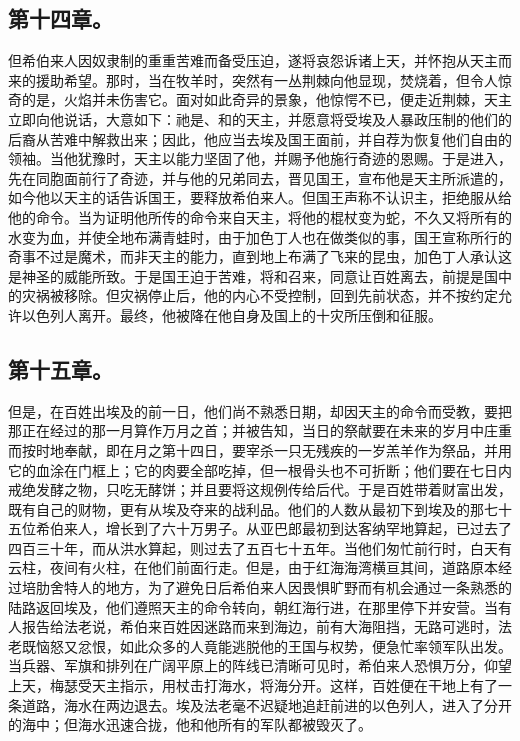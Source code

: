 
\subsection{第十四章。}

但希伯来人因奴隶制的重重苦难而备受压迫，遂将哀怨诉诸上天，并怀抱从天主而来的援助希望。那时，当在牧羊时，突然有一丛荆棘向他显现，焚烧着，但令人惊奇的是，火焰并未伤害它。面对如此奇异的景象，他惊愕不已，便走近荆棘，天主立即向他说话，大意如下：祂是、和的天主，并愿意将受埃及人暴政压制的他们的后裔从苦难中解救出来；因此，他应当去埃及国王面前，并自荐为恢复他们自由的领袖。当他犹豫时，天主以能力坚固了他，并赐予他施行奇迹的恩赐。于是进入，先在同胞面前行了奇迹，并与他的兄弟同去，晋见国王，宣布他是天主所派遣的，如今他以天主的话告诉国王，要释放希伯来人。但国王声称不认识主，拒绝服从给他的命令。当为证明他所传的命令来自天主，将他的棍杖变为蛇，不久又将所有的水变为血，并使全地布满青蛙时，由于加色丁人也在做类似的事，国王宣称所行的奇事不过是魔术，而非天主的能力，直到地上布满了飞来的昆虫，加色丁人承认这是神圣的威能所致。于是国王迫于苦难，将和召来，同意让百姓离去，前提是国中的灾祸被移除。但灾祸停止后，他的内心不受控制，回到先前状态，并不按约定允许以色列人离开。最终，他被降在他自身及国上的十灾所压倒和征服。\par


\subsection{第十五章。}

但是，在百姓出埃及的前一日，他们尚不熟悉日期，却因天主的命令而受教，要把那正在经过的那一月算作万月之首；并被告知，当日的祭献要在未来的岁月中庄重而按时地奉献，即在月之第十四日，要宰杀一只无残疾的一岁羔羊作为祭品，并用它的血涂在门框上；它的肉要全部吃掉，但一根骨头也不可折断；他们要在七日内戒绝发酵之物，只吃无酵饼；并且要将这规例传给后代。于是百姓带着财富出发，既有自己的财物，更有从埃及夺来的战利品。他们的人数从最初下到埃及的那七十五位希伯来人，增长到了六十万男子。从亚巴郎最初到达客纳罕地算起，已过去了四百三十年，而从洪水算起，则过去了五百七十五年。当他们匆忙前行时，白天有云柱，夜间有火柱，在他们前面行走。但是，由于红海海湾横亘其间，道路原本经过培肋舍特人的地方，为了避免日后希伯来人因畏惧旷野而有机会通过一条熟悉的陆路返回埃及，他们遵照天主的命令转向，朝红海行进，在那里停下并安营。当有人报告给法老说，希伯来百姓因迷路而来到海边，前有大海阻挡，无路可逃时，法老既恼怒又忿恨，如此众多的人竟能逃脱他的王国与权势，便急忙率领军队出发。当兵器、军旗和排列在广阔平原上的阵线已清晰可见时，希伯来人恐惧万分，仰望上天，梅瑟受天主指示，用杖击打海水，将海分开。这样，百姓便在干地上有了一条道路，海水在两边退去。埃及法老毫不迟疑地追赶前进的以色列人，进入了分开的海中；但海水迅速合拢，他和他所有的军队都被毁灭了。\par

